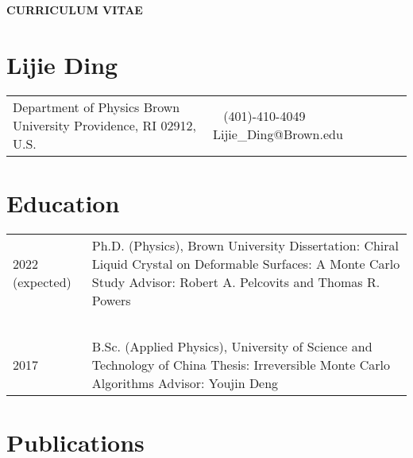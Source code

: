 \documentclass[11pt,letterpaper]{article}
\begin{document}
\pagestyle{headings}
\begin{center}
    \Large{\textbf{CURRICULUM VITAE}}
\end{center}
\section*{Lijie Ding}
\vspace*{-0.15in}
\begin{longtable}{p{0.5\linewidth} p{0.5\linewidth}}
    Department of Physics \newline
    Brown University \newline
    Providence, RI 02912, U.S.
     & ~\newline
    (401)-410-4049 \newline
    Lijie\_Ding@Brown.edu
\end{longtable}

\section*{Education}
\vspace*{-0.15in}
\begin{longtable}{l p{\linewidth}}
    2022 (expected) & Ph.D. (Physics), Brown University \newline
    Dissertation: Chiral Liquid Crystal on Deformable Surfaces: A Monte Carlo Study \newline
    Advisor: Robert A. Pelcovits and Thomas R. Powers                                                 \\~\\
    2017            & B.Sc. (Applied Physics), University of Science and Technology of China \newline
    Thesis: Irreversible Monte Carlo Algorithms \newline
    Advisor: Youjin Deng
\end{longtable}

\section*{Publications}

%
\begin{etaremune}
    \item {}
    \item {}
    \item {}
    \item {}
\end{etaremune}
\end{document}
